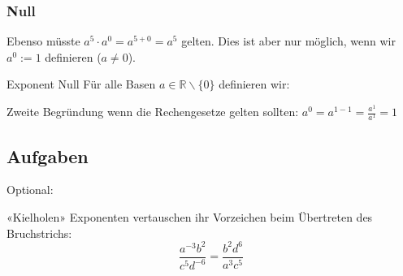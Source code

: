 \newpage



\subsubsection{Null}

Ebenso müsste $a^5 \cdot a^0 = a^{5+0} = a^5$ gelten. Dies ist aber
nur möglich, wenn wir $a^0 := 1$ definieren ($a\ne 0$).

\begin{definition}{Exponent Null}{} Für alle Basen
$a \in \mathbb{R}\backslash\{0\}$ definieren wir:
\begin{center}
\end{center}
\end{definition}

Zweite Begründung wenn die Rechengesetze gelten sollten: $a^0 = a^{1-1} = \frac{a^1}{a^1} = 1$


 




\subsection{Aufgaben}



Optional: 


\begin{rezept*}{«Kielholen»}{}{}
Exponenten vertauschen ihr Vorzeichen beim Übertreten des Bruchstrichs:
$$\frac{a^{-3}b^2}{c^5d^{-6}} = \frac{b^2d^6}{a^3c^5}$$
\end{rezept*}


\newpage
